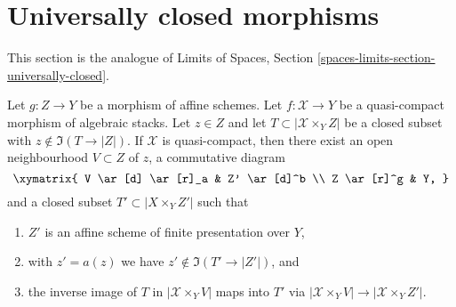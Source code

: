 \section{Universally closed morphisms}
\label{section-universally-closed}

\noindent
This section is the analogue of Limits of Spaces, Section
\ref{spaces-limits-section-universally-closed}.

\begin{lemma}
\label{lemma-separate}
Let $g : Z \to Y$ be a morphism of affine schemes.
Let $f : \mathcal{X} \to Y$ be a quasi-compact morphism of algebraic stacks.
Let $z \in Z$ and let $T \subset |\mathcal{X} \times_Y Z|$
be a closed subset with $z \not \in \Im(T \to |Z|)$.
If $\mathcal{X}$ is quasi-compact, then there exist
an open neighbourhood $V \subset Z$ of $z$,
a commutative diagram
$$
\xymatrix{
V \ar[d] \ar[r]_a & Z' \ar[d]^b \\
Z \ar[r]^g & Y,
}
$$
and a closed subset $T' \subset |X \times_Y Z'|$ such that
\begin{enumerate}
\item $Z'$ is an affine scheme of finite presentation over $Y$,
\item with $z' = a(z)$ we have $z' \not \in \Im(T' \to |Z'|)$, and
\item the inverse image of $T$ in $|\mathcal{X} \times_Y V|$
maps into $T'$ via $|\mathcal{X} \times_Y V| \to |\mathcal{X} \times_Y Z'|$.
\end{enumerate}
\end{lemma}


